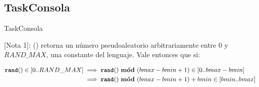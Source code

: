 \subsection{TaskConsola}

\begin{algorithm}
 \caption{TaskConsola}
 \begin{algorithmic}[1]
     \Comment{[1]}
   \EndFor
 \EndProcedure
 \end{algorithmic}
\end{algorithm}

[Nota 1]: () retorna un número pseudoaleatorio arbitrariamente entre 0 y $RAND\_MAX$, una constante del lenguaje. Vale entonces que si:

\begin{align*}
	\textbf{\texttt{rand}}() \in [0..RAND\_MAX]	&\implies \textbf{\texttt{rand}}()\text{ \textbf{m\'od} }(bmax-bmin+1) \in [0..bmax-bmin]\\
								&\implies \textbf{\texttt{rand}}()\text{ \textbf{m\'od} }(bmax-bmin+1) + bmin \in [bmin..bmax]
\end{align*}
